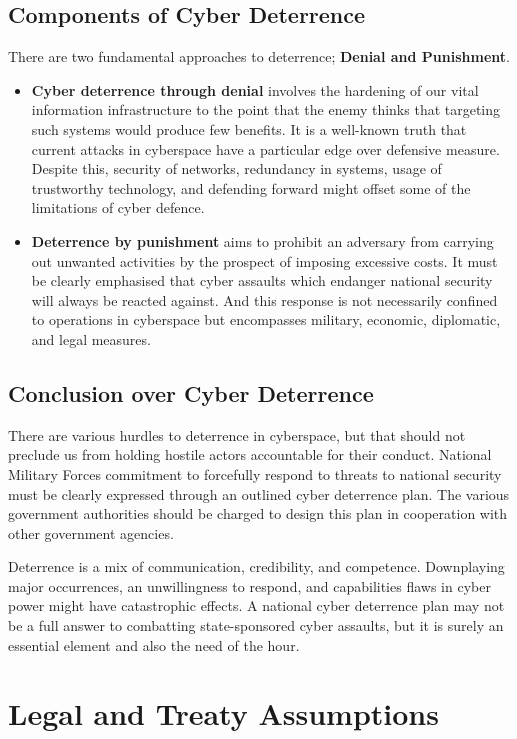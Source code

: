 \documentclass{article}
\begin{document}
\subsection{Components of Cyber Deterrence}
There are two fundamental approaches to deterrence; \textbf{Denial and Punishment}.
\begin{itemize}
\item\textbf{Cyber deterrence through denial} involves the hardening of our vital information infrastructure to the point that the enemy thinks that targeting such systems would produce few benefits. It is a well-known truth that current attacks in cyberspace have a particular edge over defensive measure. Despite this, security of networks, redundancy in systems, usage of trustworthy technology, and defending forward might offset some of the limitations of cyber defence.
\item\textbf{Deterrence by punishment} aims to prohibit an adversary from carrying out unwanted activities by the prospect of imposing excessive costs. It must be clearly emphasised that cyber assaults which endanger national security will always be reacted against. And this response is not necessarily confined to operations in cyberspace but encompasses military, economic, diplomatic, and legal measures.
\end{itemize}

\subsection{Conclusion over Cyber Deterrence}
There are various hurdles to deterrence in cyberspace, but that should not preclude us from holding hostile actors accountable for their conduct. National Military Forces commitment to forcefully respond to threats to national security must be clearly expressed through an outlined cyber deterrence plan. The various government authorities should be charged to design this plan in cooperation with other government agencies.

Deterrence is a mix of communication, credibility, and competence. Downplaying major occurrences, an unwillingness to respond, and capabilities flaws in cyber power might have catastrophic effects. A national cyber deterrence plan may not be a full answer to combatting state-sponsored cyber assaults, but it is surely an essential element and also the need of the hour.

\section{Legal and Treaty Assumptions}
\end{document}
